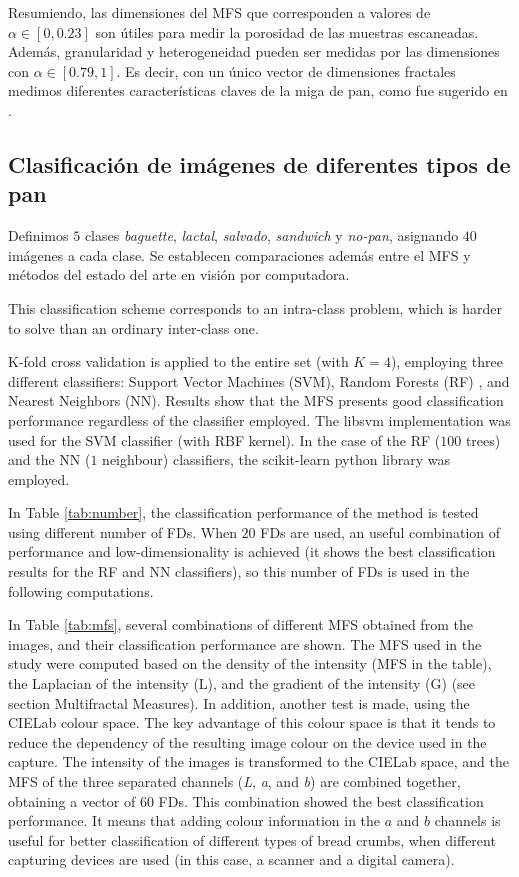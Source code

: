 \documentclass[spanish,a4paper,11pt,oneside,links]{report}
\begin{document}
Resumiendo, las dimensiones del MFS que corresponden a valores de  $\alpha \in [0,0.23]$ son útiles para medir la porosidad de las muestras escaneadas. Además, granularidad y heterogeneidad pueden ser medidas por las dimensiones con  $\alpha \in [0.79,1]$. Es decir, con un único vector de dimensiones fractales medimos diferentes características claves de la miga de pan, como fue sugerido en \cite{Gonzales2008}.

\subsection{Clasificaci\'on de imágenes de diferentes tipos de pan}

Definimos $5$ clases {\em baguette}, {\em lactal}, {\em salvado}, {\em sandwich} y {\em no-pan}, asignando $40$ imágenes a cada clase.  Se establecen comparaciones además entre el MFS y métodos del estado del arte en visión por computadora.

This classification scheme corresponds to an intra-class problem, which is harder to solve than an ordinary inter-class one. 

K-fold cross validation is applied to the entire set (with $K=4$), employing three different classifiers: Support Vector Machines (SVM), Random Forests (RF) \cite{Breiman2001}, and Nearest Neighbors (NN). Results show that the MFS presents good classification performance regardless of the classifier employed. The \textsf{libsvm} implementation \cite{Chang2011} was used for the SVM classifier (with RBF kernel). In the case of the RF ($100$ trees) and the NN ($1$ neighbour) classifiers, the \textsf{scikit-learn} python library was employed.

In Table \ref{tab:number}, the classification performance of the method is tested using different number of FDs. When $20$ FDs are used, an useful combination of performance and low-di\-men\-sio\-na\-li\-ty is achieved (it shows the best classification results for the RF and NN classifiers), so this number of FDs is used in the following computations. 

In Table \ref{tab:mfs}, several combinations of different MFS obtained from the images, and their classification performance are shown. The MFS used in the study were computed based on the density of the intensity (MFS in the table), the Laplacian of the intensity (L), and the gradient of the intensity (G) (see section Multifractal Measures). In addition, another test is made, using the CIELab \cite{Hunter58} colour space. The key advantage of this colour space is that it tends to reduce the dependency of the resulting image colour on the device used in the capture. The intensity of the images is transformed to the CIELab space, and the MFS of the three separated channels ({\em L}, {\em a}, and {\em b}) are combined together, obtaining a vector of $60$ FDs. This combination showed the best classification performance. It means that adding colour information in the $a$ and $b$ channels is useful for better classification of different types of bread crumbs, when different capturing devices are used (in this case, a scanner and a digital camera).
\end{document}
